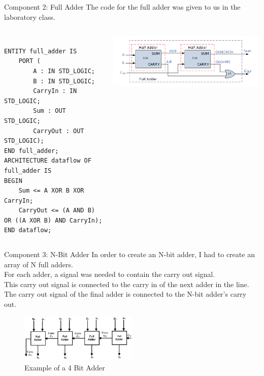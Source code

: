 \documentclass{beamer}
\begin{document}
\begin{frame}[containsverbatim]{Component 2: Full Adder}
    The code for the full adder was given to us in the laboratory class.
    \begin{columns}[T,onlytextwidth]
      \begin{column}{0.4\textwidth}
        {\scriptsize
        \begin{verbatim}

ENTITY full_adder IS
    PORT (
        A : IN STD_LOGIC;
        B : IN STD_LOGIC;
        CarryIn : IN STD_LOGIC;
        Sum : OUT STD_LOGIC;
        CarryOut : OUT STD_LOGIC);
END full_adder;
ARCHITECTURE dataflow OF full_adder IS
BEGIN
    Sum <= A XOR B XOR CarryIn;
    CarryOut <= (A AND B) OR ((A XOR B) AND CarryIn);
END dataflow;
        \end{verbatim}
        }
      \end{column}
      \begin{column}{0.6\textwidth}
        \centering
        \includegraphics[width=\textwidth]{./images/full_adder.png}
      \end{column}
    \end{columns}
\end{frame}
\begin{frame}{Component 3: N-Bit Adder}
    In order to create an N-bit adder, I had to create an array of N full adders.\\
    For each adder, a signal was needed to contain the carry out signal. \\
    This carry out signal is connected to the carry in of the next adder in the line. \\
    The carry out signal of the final adder is connected to the N-bit adder's carry out. \\
    \begin{figure}[ht]
  \centering
  \includegraphics[width=0.5\textwidth]{./images/adder_4bit.png}
  \caption{Example of a 4 Bit Adder}
\end{figure}
\end{frame}
\end{document}
